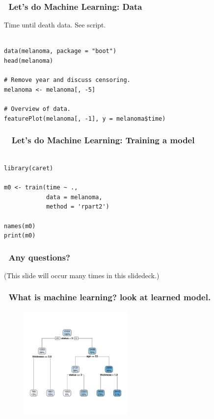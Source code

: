 \documentclass[handout, aspectratio = 169]{beamer}
\begin{document}
\begin{frame}[fragile]
\frametitle{\insertframenumber~Let's do Machine Learning: Data}
Time until death data. See script.
\begin{Verbatim}

data(melanoma, package = "boot")
head(melanoma)

# Remove year and discuss censoring.
melanoma <- melanoma[, -5]

# Overview of data.
featurePlot(melanoma[, -1], y = melanoma$time)

\end{Verbatim}

\end{frame} 

\begin{frame}[fragile]
\frametitle{\insertframenumber~ Let's do Machine Learning: Training a model}
\begin{Verbatim}

library(caret)

m0 <- train(time ~ ., 
            data = melanoma,
            method = 'rpart2')
            
names(m0)
print(m0)

\end{Verbatim}

\end{frame} 



\begin{frame}
\frametitle{\insertframenumber~Any questions?}

(This slide will occur many times in this slidedeck.)

\end{frame} 



\begin{frame}
\frametitle{\insertframenumber~What is machine learning? look at learned model.}
\vspace{-4mm}
\begin{figure}
    \includegraphics[width = 0.5\textwidth]{rpart_tree.pdf}
\end{figure} 

\end{frame} 
\end{document}
